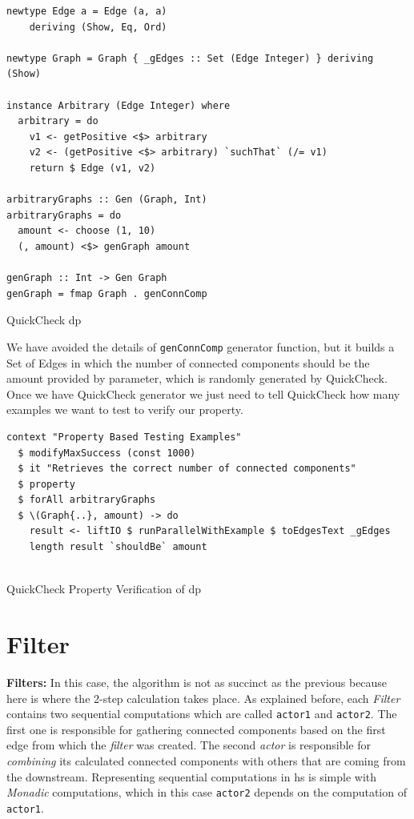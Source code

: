 \documentclass[preprint]{elsarticle}
\begin{document}
\begin{listing}[H]
  \begin{verbatim}      
newtype Edge a = Edge (a, a)
    deriving (Show, Eq, Ord)
  
newtype Graph = Graph { _gEdges :: Set (Edge Integer) } deriving (Show)
  
instance Arbitrary (Edge Integer) where
  arbitrary = do
    v1 <- getPositive <$> arbitrary
    v2 <- (getPositive <$> arbitrary) `suchThat` (/= v1)
    return $ Edge (v1, v2)
  
arbitraryGraphs :: Gen (Graph, Int)
arbitraryGraphs = do
  amount <- choose (1, 10)
  (, amount) <$> genGraph amount
  
genGraph :: Int -> Gen Graph
genGraph = fmap Graph . genConnComp
\end{verbatim}
\caption{QuickCheck \acrshort{dp}}
\label{src:haskell:7}
\end{listing}

We have avoided the details of \texttt{genConnComp} generator function, but it builds a Set of Edges 
in which the number of connected components should be the amount provided by parameter, which is randomly generated by QuickCheck.
Once we have QuickCheck generator we just need to tell QuickCheck how many examples we want to test to verify our property.

\begin{listing}[H]
\begin{verbatim}      
context "Property Based Testing Examples"
  $ modifyMaxSuccess (const 1000)
  $ it "Retrieves the correct number of connected components"
  $ property
  $ forAll arbitraryGraphs 
  $ \(Graph{..}, amount) -> do 
    result <- liftIO $ runParallelWithExample $ toEdgesText _gEdges
    length result `shouldBe` amount
    
\end{verbatim}
\caption{QuickCheck Property Verification of \acrshort{dp}}
\label{src:haskell:8}
\end{listing}


\section{Filter}
\textbf{Filters:}\newline
In this case, the algorithm is not as succinct as the previous because here is where the 2-step calculation takes place. As explained before, each \textit{Filter} contains two sequential computations which are called \texttt{actor1} and \texttt{actor2}. The first one is responsible for gathering connected components based on the first edge from which the \textit{filter} was created.  The second \textit{actor} is responsible for \textit{combining} its calculated connected components with others that are coming from the downstream. Representing sequential computations in \acrshort{hs} is simple with \emph{Monadic} computations, which in this case \texttt{actor2} depends on the computation of \texttt{actor1}.
\end{document}
